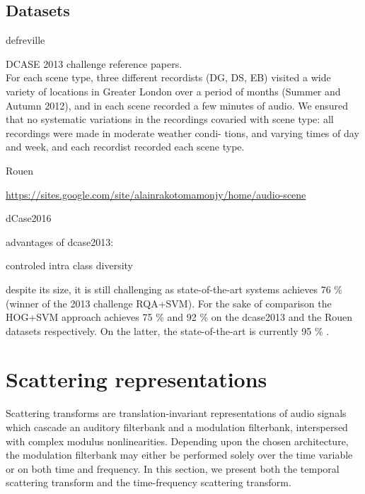 \documentclass[journal]{IEEEtran}
\begin{document}
\subsection{Datasets}

defreville \cite{aucouturier2007bag}

\cite{lagrange:hal-01082501}

DCASE 2013 challenge reference papers. \cite{giannoulis2013database, 7100934} \\

For each scene type, three different recordists (DG, DS,
EB) visited a wide variety of locations in Greater London over
a period of months (Summer and Autumn 2012), and in each
scene recorded a few minutes of audio. We ensured that no
systematic variations in the recordings covaried with scene
type: all recordings were made in moderate weather condi-
tions, and varying times of day and week, and each recordist
recorded each scene type.

Rouen \cite{rakotomamonjy2015histogram}

\url{https://sites.google.com/site/alainrakotomamonjy/home/audio-scene}

dCase2016 \cite{Mesaros2016_EUSIPCO}

advantages of dcase2013:

controled intra class diversity

despite its size, it is still challenging as state-of-the-art systems achieves 76 \% \cite{roma2013} (winner of the 2013 challenge RQA+SVM). For the sake of comparison the HOG+SVM approach \cite{rakotomamonjy2015histogram} achieves 75 \% and 92 \% on the dcase2013 and the Rouen datasets respectively. On the latter, the state-of-the-art is currently 95 \% \cite{bisot2016acoustic}.

\section{Scattering representations}
Scattering transforms are translation-invariant representations of audio signals which cascade an auditory filterbank and a modulation filterbank, interspersed with complex modulus nonlinearities.
Depending upon the chosen architecture, the modulation filterbank may either be performed solely over the time variable or on both time and frequency.
In this section, we present both the temporal scattering transform and the time-frequency scattering transform.
\end{document}
